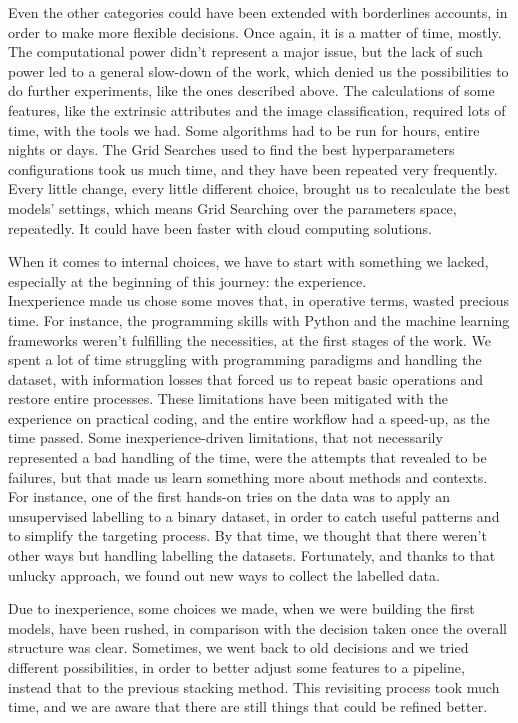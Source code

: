 Even the other categories could have been extended with borderlines accounts, in order to make more flexible decisions. Once again, it is a matter of time, mostly.
The computational power didn't represent a major issue, but the lack of such power led to a general slow-down of the work, which denied us the possibilities to do further experiments, like the ones described above.
The calculations of some features, like the extrinsic attributes and the image classification, required lots of time, with the tools we had. Some algorithms had to be run for hours, entire nights or days. The Grid Searches used to find the best hyperparameters configurations took us much time, and they have been repeated very frequently. Every little change, every little different choice, brought us to recalculate the best models' settings, which means Grid Searching over the parameters space, repeatedly.
It could have been faster with cloud computing solutions.

When it comes to internal choices, we have to start with something we lacked, especially at the beginning of this journey: the experience.\\
Inexperience made us chose some moves that, in operative terms, wasted precious time.
For instance, the programming skills with Python and the machine learning frameworks weren't fulfilling the necessities, at the first stages of the work.
We spent a lot of time struggling with programming paradigms and handling the dataset, with information losses that forced us to repeat basic operations and restore entire processes.
These limitations have been mitigated with the experience on practical coding, and the entire workflow had a speed-up, as the time passed.
Some inexperience-driven limitations, that not necessarily represented a bad handling of the time, were the attempts that revealed to be failures, but that made us learn something more about methods and contexts.
For instance, one of the first hands-on tries on the data was to apply an unsupervised labelling to a binary dataset, in order to catch useful patterns and to simplify the targeting process. By that time, we thought that there weren't other ways but handling labelling the datasets. Fortunately, and thanks to that unlucky approach, we found out new ways to collect the labelled data.

Due to inexperience, some choices we made, when we were building the first models, have been rushed, in comparison with the decision taken once the overall structure was clear. Sometimes, we went back to old decisions and we tried different possibilities, in order to better adjust some features to a pipeline, instead that to the previous stacking method. This revisiting process took much time, and we are aware that there are still things that could be refined better.

